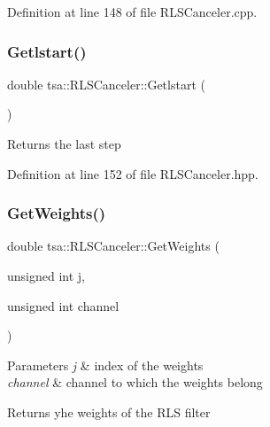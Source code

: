 Definition at line 148 of file R\+L\+S\+Canceler.\+cpp.

\mbox{\label{classtsa_1_1_r_l_s_canceler_a4387e7c608cb5f32932286caac5f3b43}} 
\subsubsection{\texorpdfstring{Getlstart()}{Getlstart()}}
{\footnotesize\ttfamily double tsa\+::\+R\+L\+S\+Canceler\+::\+Getlstart (\begin{DoxyParamCaption}{ }\end{DoxyParamCaption})\hspace{0.3cm}{\ttfamily [inline]}}

\begin{DoxyReturn}{Returns}
the last step 
\end{DoxyReturn}


Definition at line 152 of file R\+L\+S\+Canceler.\+hpp.

\mbox{\label{classtsa_1_1_r_l_s_canceler_abcff7cc0ecfe6fda9be3f0c4a698ecb4}} 
\subsubsection{\texorpdfstring{Get\+Weights()}{GetWeights()}}
{\footnotesize\ttfamily double tsa\+::\+R\+L\+S\+Canceler\+::\+Get\+Weights (\begin{DoxyParamCaption}\item[{unsigned int}]{j,  }\item[{unsigned int}]{channel }\end{DoxyParamCaption})\hspace{0.3cm}{\ttfamily [inline]}}


\begin{DoxyParams}{Parameters}
{\em j} & index of the weights \\
\hline
{\em channel} & channel to which the weights belong \\
\hline
\end{DoxyParams}
\begin{DoxyReturn}{Returns}
yhe weights of the R\+LS filter 
\end{DoxyReturn}


